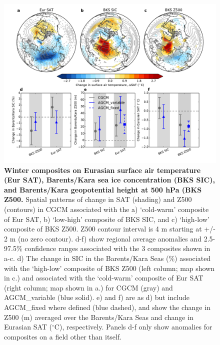 \documentclass{nature}
\begin{document}
\begin{figure}%
\centering
\noindent\includegraphics[width=39pc]{Word/Figure_5.pdf}
\caption{\textbf{Winter composites on Eurasian surface air temperature (Eur SAT), Barents/Kara sea ice concentration (BKS SIC), and Barents/Kara geopotential height at 500 hPa (BKS Z500.} Spatial patterns of change in SAT (shading) and Z500 (contours) in CGCM associated with the a) `cold-warm' composite of Eur SAT, b) `low-high' composite of BKS SIC, and c) `high-low' composite of BKS Z500. Z500 contour interval is 4 m starting at +/- 2 m (no zero contour). d-f) show regional average anomalies and 2.5-97.5\% confidence ranges associated with the 3 composites shown in a-c. d) The change in SIC in the Barents/Kara Seas (\%) associated with the `high-low' composite of BKS Z500 (left column; map shown in c.) and associated with the `cold-warm' composite of Eur SAT (right column; map shown in a.) for CGCM (gray) and AGCM\_variable (blue solid). e) and f) are as d) but include AGCM\_fixed where defined (blue dashed), and show the change in Z500 (m) averaged over the Barents/Kara Seas and change in Eurasian SAT ($^\circ$C), respectively. Panels d-f only show anomalies for composites on a field other than itself. 
} %
\label{fig:fig5} 
\end{figure}
\end{document}
